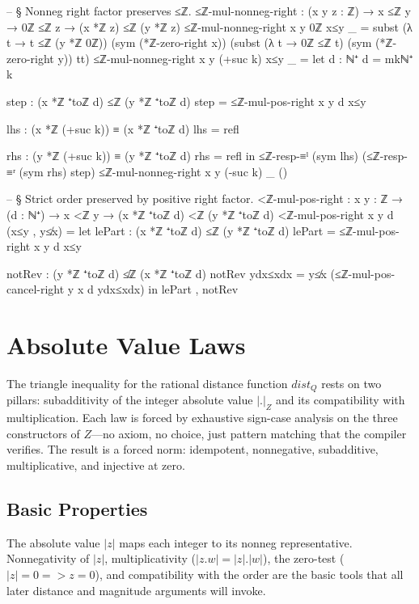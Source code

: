 \documentclass[11pt,a4paper]{book}
\def\Rightarrow{=>}%
\def\cdot{.}%
\def\mathrm#1{#1}%
\def\mathbb#1{#1}%
\begin{document}
\begin{code}
-- § Nonneg right factor preserves ≤ℤ.
≤ℤ-mul-nonneg-right : (x y z : ℤ) → x ≤ℤ y → 0ℤ ≤ℤ z → (x *ℤ z) ≤ℤ (y *ℤ z)
≤ℤ-mul-nonneg-right x y 0ℤ x≤y _ =
  subst (λ t → t ≤ℤ (y *ℤ 0ℤ)) (sym (*ℤ-zero-right x))
    (subst (λ t → 0ℤ ≤ℤ t) (sym (*ℤ-zero-right y)) tt)
≤ℤ-mul-nonneg-right x y (+suc k) x≤y _ =
  let
    d : ℕ⁺
    d = mkℕ⁺ k

    step : (x *ℤ ⁺toℤ d) ≤ℤ (y *ℤ ⁺toℤ d)
    step = ≤ℤ-mul-pos-right x y d x≤y

    lhs : (x *ℤ (+suc k)) ≡ (x *ℤ ⁺toℤ d)
    lhs = refl

    rhs : (y *ℤ (+suc k)) ≡ (y *ℤ ⁺toℤ d)
    rhs = refl
  in
  ≤ℤ-resp-≡ˡ (sym lhs) (≤ℤ-resp-≡ʳ (sym rhs) step)
≤ℤ-mul-nonneg-right x y (-suc k) _ ()

-- § Strict order preserved by positive right factor.
<ℤ-mul-pos-right : {x y : ℤ} → (d : ℕ⁺) → x <ℤ y → (x *ℤ ⁺toℤ d) <ℤ (y *ℤ ⁺toℤ d)
<ℤ-mul-pos-right {x} {y} d (x≤y , y≰x) =
  let
    lePart : (x *ℤ ⁺toℤ d) ≤ℤ (y *ℤ ⁺toℤ d)
    lePart = ≤ℤ-mul-pos-right x y d x≤y

    notRev : (y *ℤ ⁺toℤ d) ≰ℤ (x *ℤ ⁺toℤ d)
    notRev ydx≤xdx = y≰x (≤ℤ-mul-pos-cancel-right y x d ydx≤xdx)
  in
  lePart , notRev
\end{code}

\chapter{Absolute Value Laws}

The triangle inequality for the rational distance function $\mathrm{dist}_{\mathbb{Q}}$ rests on two pillars: subadditivity of the integer absolute value $|\cdot|_{\mathbb{Z}}$ and its compatibility with multiplication. Each law is forced by exhaustive sign-case analysis on the three constructors of $\mathbb{Z}$---no axiom, no choice, just pattern matching that the compiler verifies. The result is a forced norm: idempotent, nonnegative, subadditive, multiplicative, and injective at zero.

\section{Basic Properties}

The absolute value $|z|$ maps each integer to its nonneg representative.
Nonnegativity of $|z|$, multiplicativity ($|z \cdot w| = |z| \cdot |w|$), the zero-test ($|z| = 0 \Rightarrow z = 0$), and compatibility with the order are the basic tools that all later distance and magnitude arguments will invoke.
\end{document}
